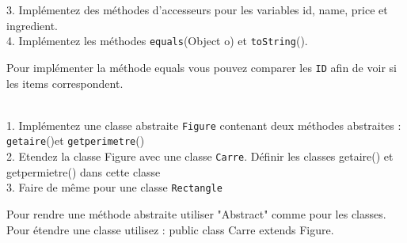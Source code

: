 \begin{Exercice}[10 minutes]
3. Implémentez des méthodes d'accesseurs pour les variables id, name, price et ingredient.\\

4. Implémentez les méthodes \lstinline{equals}(Object o) et \lstinline{toString}().

\begin{conseil}
Pour implémenter la méthode equals vous pouvez comparer les \lstinline{ID} afin de voir si les items correspondent.
\end{conseil}

    \begin{solution}
 \begin{itemize}
             
    \end{itemize}
    \end{solution}
\end{Exercice}


\begin{Exercice}[10 minutes]\\
1. Implémentez une classe abstraite \lstinline{Figure} contenant deux méthodes abstraites : \lstinline{getaire}()et \lstinline{getperimetre}()\\
2. Etendez la classe Figure avec une classe \lstinline{Carre}. Définir les classes getaire() et getpermietre() dans cette classe\\
3. Faire de même pour une classe \lstinline{Rectangle}\\

\begin{conseil}
    Pour rendre une méthode abstraite utiliser "Abstract" comme pour les classes.\\
    Pour étendre une classe utilisez : public class Carre extends Figure. 
\end{conseil}



    \begin{solution}
 \begin{itemize}
 
    \end{itemize}
    \end{solution}
\end{Exercice}

